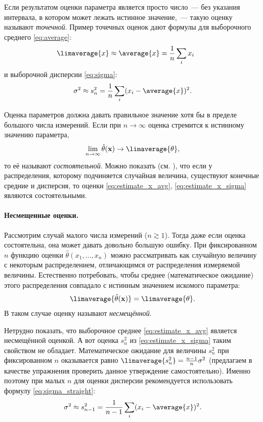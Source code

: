 Если результатом оценки параметра является просто число~---
без указания интервала, в котором может лежать истинное значение,~---
такую оценку называют \emph{точечной}.
Пример точечных оценок дают формулы для выборочного среднего
\eqref{eq:average}:
\begin{equation}
\limaverage{x} \approx \average{x} = \frac{1}{n}\sum_i x_i\qquad
\label{eq:estimate_x_avg}
\end{equation}
и выборочной дисперсии \eqref{eq:sigma}:
\begin{equation}
\sigma^2 \approx s^2_n = \frac{1}{n}\sum_i (x_i - \average{x})^2.
\label{eq:estimate_x_sigma}
\end{equation}


Оценка параметров должна давать правильное значение
хотя бы в пределе большого числа измерений.
Если при $n\to \infty$ оценка стремится к истинному значению параметра,
\[
\lim_{n\to \infty} \hat{\theta}(\mathbf{x}) \to \limaverage{\theta},
\]
то её называют \emph{состоятельной}.
Можно показать (см. \cite{idie}), что если у распределения,
которому подчиняется случайная величина,
существуют конечные средние и дисперсия, то оценки
\eqref{eq:estimate_x_avg}, \eqref{eq:estimate_x_sigma} являются состоятельными.

\paragraph{Несмещенные оценки.}
Рассмотрим случай малого числа измерений ($n\gtrsim 1$).
Тогда даже если оценка состоятельна, она может давать довольно большую ошибку.
При фиксированном $n$ функцию оценки $\hat{\theta}(x_1,\ldots,x_n)$
можно рассматривать как случайную величину с некоторым распределением,
отличающимся от распределения измеряемой величины.
Естественно потребовать, чтобы среднее (математическое ожидание) этого
распределения совпадало с истинным значением искомого параметра:
\[
\limaverage{\strut\hat{\theta}(\mathbf{x})} = \limaverage{\theta}.
\]
В таком случае оценку называют \emph{несмещённой}.

Нетрудно показать, что выборочное среднее \eqref{eq:estimate_x_avg}
является несмещённой оценкой. А вот оценка $s_n^2$ из
\eqref{eq:estimate_x_sigma} таким свойством не обладает. Математическое
ожидание для величины $s_n^2$ при фиксированном $n$ оказывается равно
$\limaverage{s_n^2} = \frac{n-1}{n} \sigma^2$ (предлагаем в качестве упражнения
проверить данное утверждение самостоятельно). Именно поэтому при малых $n$
для оценки дисперсии рекомендуется использовать формулу
\eqref{eq:sigma_straight}:
\[
\sigma^2 \approx s^2_{n-1} = \frac{1}{n-1}\sum_i (x_i - \average{x})^2.
\]

